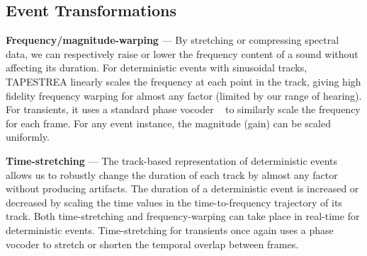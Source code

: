 \documentclass[review]{acmsiggraph}      %
\begin{document}
\subsection{Event Transformations}

\textbf{Frequency/magnitude-warping} --- By stretching or compressing spectral
data, we can respectively raise or lower the frequency content of a sound without 
affecting its duration.  For deterministic events with sinusoidal tracks, 
TAPESTREA linearly scales the frequency at each point in the track, 
giving high fidelity frequency warping for almost any factor (limited by our 
range of hearing). For transients, it uses a standard phase vocoder ~\cite{Dolson86} to 
similarly scale the frequency for each frame.
For any event instance, the magnitude (gain) can be scaled uniformly.

\textbf{Time-stretching} --- The track-based representation of deterministic events allows us 
to robustly change the duration of each track by almost any factor without 
producing artifacts. The duration of a deterministic event is increased or 
decreased by scaling the time values in the time-to-frequency trajectory of its track. 
Both time-stretching and frequency-warping can take place in 
real-time for deterministic events. Time-stretching for transients once again uses a phase 
vocoder to stretch or shorten the temporal overlap between frames.  

\end{document}
